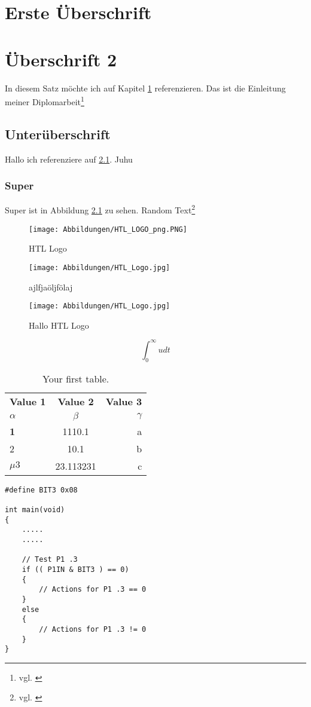 \chapter{Erste Überschrift}
\label{sec:ErsteÜberschrift}

\chapter{Überschrift 2}
\label{sec:Überschrift2}

In diesem Satz möchte ich auf Kapitel \ref{sec:ErsteÜberschrift} referenzieren.
Das ist die Einleitung meiner Diplomarbeit\footnote{vgl. \cite{mann}}

\section{Unterüberschrift}
\label{sec:Unterüberschrift}
Hallo ich referenziere auf \ref{sec:Unterüberschrift}. Juhu

\subsection{Super}
\label{sec:Super}

Super ist in Abbildung \ref{fig:HTL_LOGO_png} zu sehen.
Random Text\footnote{vgl. \cite{holzer}}

\begin{figure}[htbp]
	\centering
		\texttt{[image: Abbildungen/HTL\_LOGO\_png.PNG]}
	\caption{HTL Logo}
	\label{fig:HTL_LOGO_png}
\end{figure}

\begin{figure}[h]
	\centering
		\texttt{[image: Abbildungen/HTL\_Logo.jpg]}
	\caption{ajlfjaöljfölaj}
	\label{fig:HTL_Logo}
\end{figure}


\begin{figure}
	\centering
		\texttt{[image: Abbildungen/HTL\_Logo.jpg]}
	\caption{Hallo HTL Logo}
	\label{fig:HTL_Logo}
\end{figure}



\[
		\int_0^{\infty} u dt
\]

\begin{table}[h!]
  \begin{center}
    \caption{Your first table.}
    \label{tab:table1}
    \begin{tabular}{l|c|r} %
      \textbf{Value 1} & \textbf{Value 2} & \textbf{Value 3}\\
      $\alpha$ & $\beta$ & $\gamma$ \\
      \hline
      \textbf{1} & 1110.1 & a\\
      2 & 10.1 & b\\
      $\mu 3$ & 23.113231 & c\\
    \end{tabular}
  \end{center}
\end{table}

\begin{lstlisting}
#define BIT3 0x08

int main(void)
{ 
	.....
	.....
	
	// Test P1 .3
	if (( P1IN & BIT3 ) == 0) 
	{ 
		// Actions for P1 .3 == 0
	} 
	else 
	{
		// Actions for P1 .3 != 0
	}
}
\end{lstlisting}